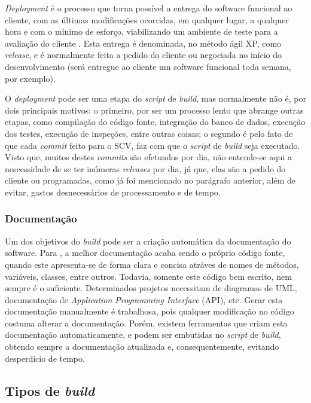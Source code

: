 \textit{Deployment} é o processo que torna possível a entrega do software funcional ao cliente, com as últimas modificações ocorridas, em qualquer lugar, a qualquer hora e com o mínimo de esforço, viabilizando um ambiente de teste para a avaliação do cliente \cite{DUVALL}. Esta entrega é denominada, no método ágil XP, como \textit{release}, e é normalmente feita a pedido do cliente ou negociada no início do desenvolvimento (será entregue ao cliente um software funcional toda semana, por exemplo).

O \textit{deployment} pode ser uma etapa do \textit{script} de \textit{build}, mas normalmente não é, por dois principais motivos: o primeiro, por ser um processo lento que abrange outras etapas, como compilação do código fonte, integração do banco de dados, execução dos testes, execução de inspeções, entre outras coisas; o segundo é pelo fato de que cada \textit{commit} feito para o SCV, faz com que o \textit{script} de \textit{build} seja executado. Visto que, muitos destes \textit{commits} são efetuados por dia,  não entende-se aqui a nescessidade de se ter inúmeras \textit{releases} por dia, já que, elas são a pedido do cliente ou programadas, como já foi mencionado no parágrafo anterior, além de evitar, gastos desnecessários de processamento e de tempo.

\subsubsection{Documentação}

Um dos objetivos do \textit{build} pode ser a criação automática da documentação do software. Para , a melhor documentação acaba sendo o próprio código fonte, quando este apresenta-se de forma clara e concisa atráves de nomes de métodos, variáveis, classes, entre outros. Todavia, somente este código bem escrito, nem sempre é o suficiente. Determinados projetos necessitam de diagramas de UML, documentação de \textit{Application Programming Interface} (API), etc. Gerar esta documentação manualmente é trabalhosa, pois qualquer modificação no código costuma alterar a documentação. Porém, existem ferramentas que criam esta documentação automaticamente, e podem ser embutidas no \textit{script} de \textit{build}, obtendo sempre a documentação atualizada e, consequentemente, evitando desperdício de tempo.

\subsection{Tipos de \textit{build}}

